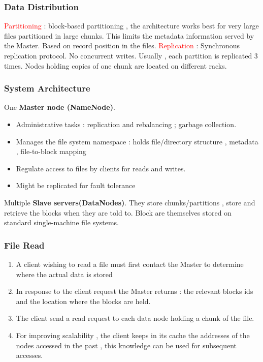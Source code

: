 \documentclass{article}
\begin{document}
\subsubsection{Data Distribution}

\textcolor{red}{Partitioning} : block-based partitioning , the architecture works best for very large files partitioned in large chunks. This limits the metadata information served by the Master. Based on record position in the files.
\textcolor{red}{Replication} : Synchronous replication protocol. No concurrent writes. Usually , each partition is replicated 3 times. Nodes holding copies of one chunk are located on different racks.

\subsubsection{System Architecture}
One \textbf{Master node (NameNode)}.
\begin{itemize}
    \item Administrative tasks : replication and rebalancing ; garbage collection.
    \item Manages the file system namespace : holds file/directory structure , metadata , file-to-block mapping
    \item Regulate access to files by clients for reads and writes.
    \item Might be replicated for fault tolerance
\end{itemize}
Multiple \textbf{Slave servers(DataNodes)}. They store chunks/partitions , store and retrieve the blocks when they are told to.
Block are themselves stored on standard single-machine file systems.

\subsubsection{File Read}
\begin{enumerate}
    \item A client wishing to read a file must first contact the Master to determine where the actual data is stored
    \item In response to the client request the Master returns : the relevant blocks ids and the location where the blocks are held.
    \item The client send a read request to each data node holding a chunk of the file.
    \item For improving scalability , the client keeps in its cache the addresses of the nodes accessed in the past , this knowledge can be used for subsequent accesses.
\end{enumerate}
\end{document}
